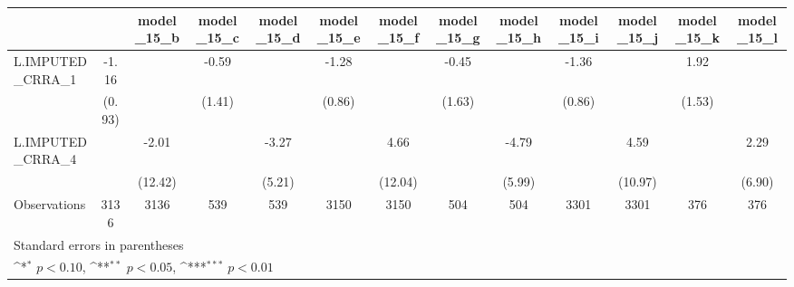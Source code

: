 {
\def\sym#1{\ifmmode^{#1}\else\(^{#1}\)\fi}
\begin{tabular}{l*{12}{c}}
\toprule
                &\multicolumn{1}{c}{}&\multicolumn{1}{c}{model\_15\_b}&\multicolumn{1}{c}{model\_15\_c}&\multicolumn{1}{c}{model\_15\_d}&\multicolumn{1}{c}{model\_15\_e}&\multicolumn{1}{c}{model\_15\_f}&\multicolumn{1}{c}{model\_15\_g}&\multicolumn{1}{c}{model\_15\_h}&\multicolumn{1}{c}{model\_15\_i}&\multicolumn{1}{c}{model\_15\_j}&\multicolumn{1}{c}{model\_15\_k}&\multicolumn{1}{c}{model\_15\_l}\\
\midrule
L.IMPUTED\_CRRA\_1&    -1.16         &                  &    -0.59         &                  &    -1.28         &                  &    -0.45         &                  &    -1.36         &                  &     1.92         &                  \\
                &   (0.93)         &                  &   (1.41)         &                  &   (0.86)         &                  &   (1.63)         &                  &   (0.86)         &                  &   (1.53)         &                  \\
\addlinespace
L.IMPUTED\_CRRA\_4&                  &    -2.01         &                  &    -3.27         &                  &     4.66         &                  &    -4.79         &                  &     4.59         &                  &     2.29         \\
                &                  &  (12.42)         &                  &   (5.21)         &                  &  (12.04)         &                  &   (5.99)         &                  &  (10.97)         &                  &   (6.90)         \\
\midrule
Observations    &     3136         &     3136         &      539         &      539         &     3150         &     3150         &      504         &      504         &     3301         &     3301         &      376         &      376         \\
\bottomrule
\multicolumn{13}{l}{\footnotesize Standard errors in parentheses}\\
\multicolumn{13}{l}{\footnotesize \sym{*} \(p<0.10\), \sym{**} \(p<0.05\), \sym{***} \(p<0.01\)}\\
\end{tabular}
}
